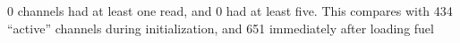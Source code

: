0 channels had at least one read, and 0 had at least five.  
This compares with 434 ``active'' channels during initialization, and 651 immediately after loading fuel

